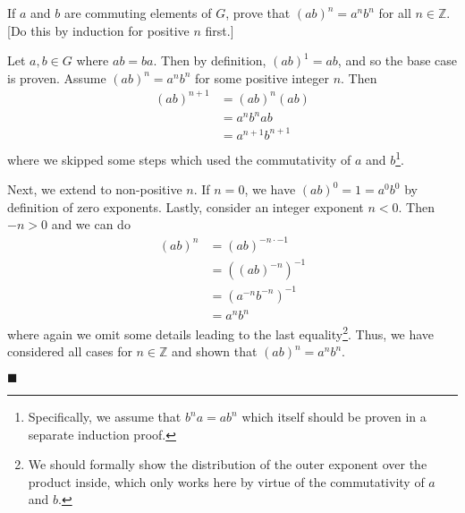 \documentclass[12pt]{article}
\renewcommand{\qed}{\hfill$\blacksquare$}
\renewenvironment{proof}{\begin{addmargin}[1em]{0em}\begin{newproof}}{\end{newproof}\end{addmargin}\qed}
\newenvironment{problem}[2][Exercise]{\begin{trivlist}
\item[\hskip \labelsep {\bfseries #1}\hskip \labelsep {\bfseries #2.}]}{\end{trivlist}}
\begin{document}
\begin{problem}{1.1.24}
If $a$ and $b$ are commuting elements of $G$, prove that $\left(ab\right)^n = a^n b^n$ for all $n\in \mathbb{Z}$. [Do this by induction for positive $n$ first.]
\end{problem}
\begin{proof}
Let $a,b\in G$ where $ab=ba$. Then by definition, $\left(ab\right)^1 = ab$, and so the base case is proven. Assume $\left(ab\right)^n=a^nb^n$ for some positive integer $n$. Then
\begin{equation*}
    \begin{split}
        \left(ab\right)^{n+1} & = \left(ab\right)^n \left(ab\right) \\
        & = a^nb^n a b \\
        & = a^{n+1}b^{n+1}\\
    \end{split}
\end{equation*}
where we skipped some steps which used the commutativity of $a$ and $b$\footnote{Specifically, we assume that $b^n a = a b^n$ which itself should be proven in a separate induction proof.}.

Next, we extend to non-positive $n$. If $n=0$, we have $\left(ab\right)^0 = 1 = a^0b^0$ by definition of zero exponents. Lastly, consider an integer exponent $n<0$. Then $-n >0 $ and we can do
\begin{equation*}
    \begin{split}
        \left(ab\right)^{n} & = \left(ab\right)^{-n\cdot-1} \\
        & = \left(\left(ab\right)^{-n}\right)^{-1} \\
        & = \left(a^{-n}b^{-n}\right)^{-1} \\
        & = a^n b^n
    \end{split}
\end{equation*}
where again we omit some details leading to the last equality\footnote{We should formally show the distribution of the outer exponent over the product inside, which only works here by virtue of the commutativity of $a$ and $b$.}.
Thus, we have considered all cases for $n\in\mathbb{Z}$ and shown that $\left(ab\right)^n = a^nb^n$.
\end{proof}
\end{document}
